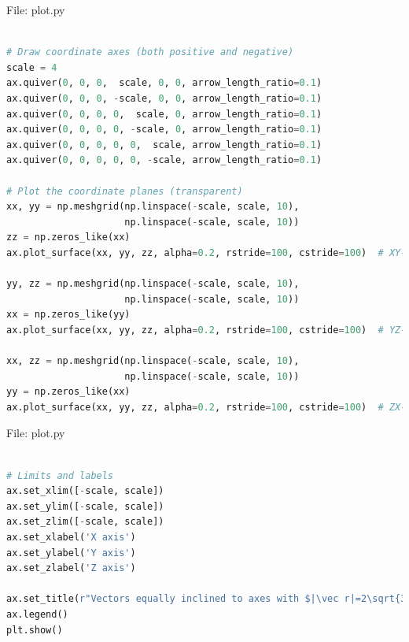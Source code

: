 \documentclass{beamer}
\numberwithin{equation}{section}
\theoremstyle{remark}
\let\vec\mathbf
\begin{document}
\begin{frame}[fragile]{File: plot.py}
\begin{lstlisting}[language=Python]

# Draw coordinate axes (both positive and negative)
scale = 4
ax.quiver(0, 0, 0,  scale, 0, 0, arrow_length_ratio=0.1)
ax.quiver(0, 0, 0, -scale, 0, 0, arrow_length_ratio=0.1)
ax.quiver(0, 0, 0, 0,  scale, 0, arrow_length_ratio=0.1)
ax.quiver(0, 0, 0, 0, -scale, 0, arrow_length_ratio=0.1)
ax.quiver(0, 0, 0, 0, 0,  scale, arrow_length_ratio=0.1)
ax.quiver(0, 0, 0, 0, 0, -scale, arrow_length_ratio=0.1)

# Plot the coordinate planes (transparent)
xx, yy = np.meshgrid(np.linspace(-scale, scale, 10),
                     np.linspace(-scale, scale, 10))
zz = np.zeros_like(xx)
ax.plot_surface(xx, yy, zz, alpha=0.2, rstride=100, cstride=100)  # XY-plane

yy, zz = np.meshgrid(np.linspace(-scale, scale, 10),
                     np.linspace(-scale, scale, 10))
xx = np.zeros_like(yy)
ax.plot_surface(xx, yy, zz, alpha=0.2, rstride=100, cstride=100)  # YZ-plane

xx, zz = np.meshgrid(np.linspace(-scale, scale, 10),
                     np.linspace(-scale, scale, 10))
yy = np.zeros_like(xx)
ax.plot_surface(xx, yy, zz, alpha=0.2, rstride=100, cstride=100)  # ZX-plane
\end{lstlisting}
\end{frame}

\begin{frame}[fragile]{File: plot.py}
\begin{lstlisting}[language=Python]

# Limits and labels
ax.set_xlim([-scale, scale])
ax.set_ylim([-scale, scale])
ax.set_zlim([-scale, scale])
ax.set_xlabel('X axis')
ax.set_ylabel('Y axis')
ax.set_zlabel('Z axis')

ax.set_title(r"Vectors equally inclined to axes with $|\vec r|=2\sqrt{3}$")
ax.legend()
plt.show()

\end{lstlisting}
\end{frame}
\end{document}
